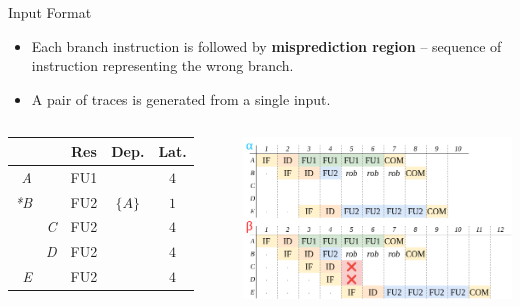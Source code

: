 \documentclass{beamer}
\begin{document}

\begin{frame}{Input Format}

\begin{itemize}
    \item Each branch instruction is followed by \textbf{misprediction region} -- sequence of instruction representing the wrong branch.
    \item A pair of traces is generated from a single input.
\end{itemize}

\begin{columns}
        \begin{tabular}{rr|ccc}
         &  & Res & Dep. & Lat. \\ \hline
        \textit{A} &  & FU1 &  & $4$ \\
        \textit{*B} &  & FU2 & $\{A\}$ & $1$ \\
        & \textit{C} & FU2 &  & $4$ \\
        & \textit{D} & FU2 &  & $4$ \\
        \textit{E} &  & FU2 &  & $4$ \\
        \end{tabular}

        \includegraphics[width=\textwidth]{pic/mispred-intro.png}
\end{columns}

\end{frame}
\end{document}
